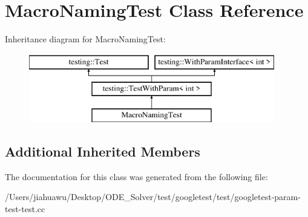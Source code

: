 \hypertarget{class_macro_naming_test}{}\section{Macro\+Naming\+Test Class Reference}
\label{class_macro_naming_test}
Inheritance diagram for Macro\+Naming\+Test\+:\begin{figure}[H]
\begin{center}
\leavevmode
\includegraphics[height=3.000000cm]{class_macro_naming_test}
\end{center}
\end{figure}
\subsection*{Additional Inherited Members}


The documentation for this class was generated from the following file\+:\begin{DoxyCompactItemize}
\item 
/\+Users/jiahuawu/\+Desktop/\+O\+D\+E\+\_\+\+Solver/test/googletest/test/googletest-\/param-\/test-\/test.\+cc\end{DoxyCompactItemize}

